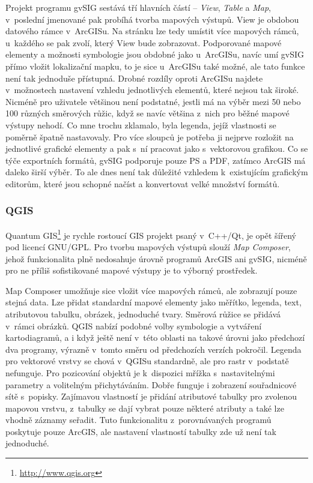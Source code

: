 \documentclass[a4paper,12pt,draft]{article}
\begin{document}
Projekt programu gvSIG sestává tří hlavních částí -- \emph{View},
\emph{Table} a \emph{Map}, v~poslední jmenované pak probíhá tvorba
mapových výstupů. View je obdobou datového rámce v~ArcGISu. Na stránku
lze tedy umístit více mapových rámců, u~každého se pak zvolí,
který View bude zobrazovat. Podporované mapové elementy a možnosti
symbologie jsou obdobné
jako u~ArcGISu, navíc umí gvSIG přímo vložit lokalizační mapku,
to je sice u~ArcGISu také možné, ale tato funkce není tak jednoduše
přístupná. Drobné rozdíly oproti ArcGISu najdete v~možnostech nastavení
vzhledu
jednotlivých elementů, které nejsou tak široké. Nicméně pro uživatele
většinou
není podstatné, jestli má na výběr mezi 50 nebo 100 různých směrových
růžic,
když se navíc  většina z~nich  pro běžné mapové výstupy nehodí.
Co mne trochu zklamalo,
byla legenda, jejíž vlastnosti se poměrně špatně nastavovaly. Pro
více sloupců je potřeba ji nejprve rozložit na jednotlivé grafické
elementy a pak s~ní pracovat jako s~vektorovou grafikou. Co se týče
exportních formátů, gvSIG podporuje pouze PS a PDF, zatímco ArcGIS
má daleko širší výběr. To ale dnes není tak důležité vzhledem
k~existujícím grafickým editorům, které jsou schopné načíst a
konvertovat velké množství formátů.

\subsubsection{QGIS}
Quantum GIS\footnote{\url{http://www.qgis.org}} je rychle rostoucí GIS projekt
psaný v~C++/Qt, je opět šířený
pod licencí GNU/GPL. Pro tvorbu mapových výstupů slouží \emph{Map
Composer}, jehož funkcionalita plně nedosahuje úrovně programů ArcGIS
ani gvSIG, nicméně pro ne příliš sofistikované mapové výstupy je to
výborný prostředek.

Map Composer umožňuje sice vložit více mapových rámců, ale
zobrazují pouze stejná data. Lze přidat standardní mapové elementy
jako měřítko, legenda, text, atributovou tabulku, obrázek, jednoduché
tvary. Směrová růžice se přidává v~rámci obrázků.
QGIS nabízí podobné volby symbologie a vytváření kartodiagramů,
a i když
ještě není v~této oblasti na takové úrovni jako předchozí dva
programy, výrazně
v~tomto směru od předchozích verzích pokročil.
Legenda pro vektorové vrstvy se chová v~QGISu standardně, ale
pro rastr v~podstatě nefunguje. Pro pozicování objektů je k~dispozici
mřížka s~nastavitelnými parametry a volitelným přichytáváním. Dobře
funguje i zobrazení souřadnicové sítě s~popisky. Zajímavou
vlastností je přidání atributové tabulky pro zvolenou mapovou
vrstvu, z~tabulky se dají vybrat pouze některé atributy a také lze
vhodně záznamy seřadit. Tuto funkcionalitu z~porovnávaných programů
poskytuje pouze ArcGIS, ale nastavení vlastností tabulky zde už není
tak jednoduché.
\end{document}

